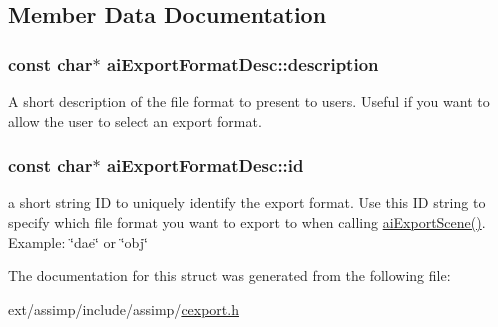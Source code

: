 \subsection{Member Data Documentation}
\hypertarget{structai_export_format_desc_a9c84c4b07c5177fb6539b9bdf90236fb}{
\subsubsection[{description}]{\setlength{\rightskip}{0pt plus 5cm}const char$\ast$ ai\-Export\-Format\-Desc\-::description}}\label{structai_export_format_desc_a9c84c4b07c5177fb6539b9bdf90236fb}
A short description of the file format to present to users. Useful if you want to allow the user to select an export format. \hypertarget{structai_export_format_desc_afe216eaea3a04abca041e5c253f94bbf}{
\subsubsection[{id}]{\setlength{\rightskip}{0pt plus 5cm}const char$\ast$ ai\-Export\-Format\-Desc\-::id}}\label{structai_export_format_desc_afe216eaea3a04abca041e5c253f94bbf}
a short string I\-D to uniquely identify the export format. Use this I\-D string to specify which file format you want to export to when calling \hyperlink{cexport_8h_a9615510b8430a9da4f435a72148128dd}{ai\-Export\-Scene()}. Example\-: \char`\"{}dae\char`\"{} or \char`\"{}obj\char`\"{} 

The documentation for this struct was generated from the following file\-:\begin{DoxyCompactItemize}
\item 
ext/assimp/include/assimp/\hyperlink{cexport_8h}{cexport.\-h}\end{DoxyCompactItemize}
